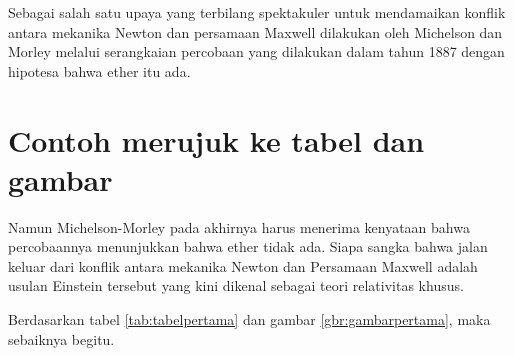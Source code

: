 Sebagai salah satu upaya yang terbilang spektakuler untuk mendamaikan konflik antara mekanika Newton dan persamaan Maxwell dilakukan oleh Michelson dan Morley melalui serangkaian percobaan yang dilakukan dalam tahun 1887 dengan hipotesa bahwa ether itu ada. 

\section{Contoh merujuk ke tabel dan gambar}

Namun Michelson-Morley pada akhirnya harus menerima kenyataan bahwa percobaannya menunjukkan bahwa ether tidak ada. Siapa sangka bahwa jalan keluar dari konflik antara mekanika Newton dan Persamaan Maxwell adalah usulan Einstein tersebut yang kini dikenal sebagai teori relativitas khusus. 

Berdasarkan tabel \ref{tab:tabelpertama} dan gambar \ref{gbr:gambarpertama}, maka sebaiknya begitu.

